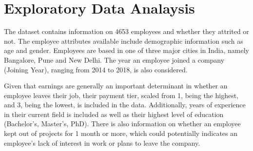 \documentclass[11pt,preprint, authoryear]{elsarticle}
\numberwithin{equation}{section}
\numberwithin{figure}{section}
\numberwithin{table}{section}
\begin{document}
\hypertarget{exploratory-data-analaysis}{%
\section*{Exploratory Data Analaysis}\label{exploratory-data-analaysis}}

The dataset contains information on 4653 employees and whether they
attrited or not. The employee attributes available include demographic
information such as age and gender. Employees are based in one of three
major cities in India, namely Bangalore, Pune and New Delhi. The year an
employee joined a company (Joining Year), ranging from 2014 to 2018, is
also considered.

Given that earnings are generally an important determinant in whether an
employee leaves their job, their payment tier, scaled from 1, being the
highest, and 3, being the lowest, is included in the data. Additionally,
years of experience in their current field is included as well as their
highest level of education (Bachelor's, Master's, PhD). There is also
information on whether an employee kept out of projects for 1 month or
more, which could potentially indicates an employee's lack of interest
in work or plans to leave the company.
\end{document}

